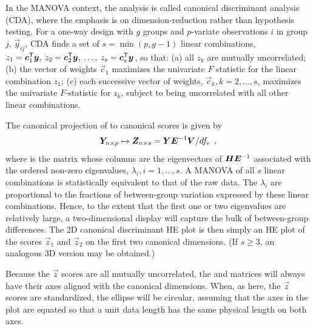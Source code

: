 
In the MANOVA context, the analysis is called canonical discriminant analysis (CDA), where the emphasis
is on dimension-reduction rather than hypothesis testing.
For a one-way design with $g$ groups and $p$-variate
observations $i$ in group $j$, $\vec{y}_{ij}$, CDA finds a set of $s = \min(p, g-1)$
linear combinations, $z_1 = \bm{c}_1 ^\mathsf{T} \bm{y}, \:
 z_2 = \bm{c}_2 ^\mathsf{T} \bm{y}, \: \dots, \:
 z_s = \bm{c}_s ^\mathsf{T} \bm{y}$,
so that: (a) all $z_k$ are mutually uncorrelated; (b) the vector of
weights $\vec{c}_1$ maximizes the univariate $F$ statistic for the
linear combination $z_1$; (c) each successive vector of weights,
$\vec{c}_k, k=2, \dots, s$, maximizes the univariate $F$-statistic
for $z_k$, subject to being uncorrelated with all other linear
combinations.

The canonical projection of   to canonical scores  is given by
\begin{equation}
\bm{Y}_{n \times p} \mapsto \bm{Z}_{n \times s} = \bm{Y} \bm{\bm{E}}^{-1} \bm{V} / df_e \:\: ,
\end{equation}
where  is the matrix whose columns are the eigenvectors of $\bm{H} \bm{\bm{E}}^{-1}$
associated with the ordered non-zero eigenvalues, \(\lambda_i, i=1,\dots, s\).
A MANOVA of all $s$ linear combinations is statistically
equivalent to that of the raw data.
The \(\lambda_i\)
are proportional to the fractions of between-group variation
expressed by these linear combinations.
Hence, to the extent that the first one or two
eigenvalues are relatively large, a two-dimensional display will
capture the bulk of between-group differences. The 2D canonical
discriminant HE plot is then simply an HE plot of the scores
$\vec{z}_1$ and $\vec{z}_2$ on the first two canonical dimensions.
(If $s\ge3$, an analogous 3D version may be obtained.)

Because the $\vec{z}$ scores are all mutually uncorrelated, the  and
 matrices will always have their axes aligned with the
canonical dimensions. When, as here, the $\vec{z}$ scores are
standardized, the  ellipse will be circular, assuming that
the axes in the plot are equated so that a unit data length has the same
physical length on both axes.

